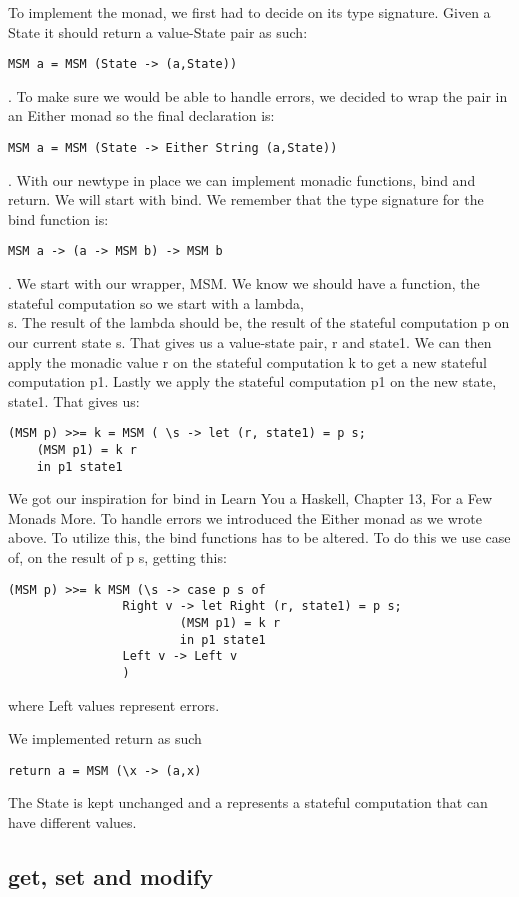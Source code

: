 \documentclass[]{article}
\begin{document}
To implement the monad, we first had to decide on its type signature. Given a State it should return a value-State pair as such: \begin{verbatim}MSM a = MSM (State -> (a,State))\end{verbatim}. To make sure we would be able to handle errors, we decided to wrap the pair in an Either monad so the final declaration is: \begin{verbatim}MSM a = MSM (State -> Either String (a,State))\end{verbatim}.
With our newtype in place we can implement monadic functions, bind and return. 
We will start with bind. We remember that the type signature for the bind function is: 
\begin{verbatim}MSM a -> (a -> MSM b) -> MSM b\end{verbatim}. We start with our wrapper, MSM. We know we should have a function, the stateful computation so we start with a lambda, \\s. The result of the lambda should be, the result of the stateful computation p on our current state s. That gives us a value-state pair, r and state1. We can then apply the monadic value r on the stateful computation k to get a new stateful computation p1. Lastly we apply the stateful computation p1 on the new state, state1. That gives us: 
\begin{verbatim}(MSM p) >>= k = MSM ( \s -> let (r, state1) = p s;
	(MSM p1) = k r
	in p1 state1
\end{verbatim}
We got our inspiration for bind in Learn You a Haskell, Chapter 13, For a Few Monads More.
To handle errors we introduced the Either monad as we wrote above. To utilize this, the bind functions has to be altered. To do this we use case of, on the result of p s,  getting this:
\begin{verbatim}
(MSM p) >>= k MSM (\s -> case p s of
				Right v -> let Right (r, state1) = p s;
						(MSM p1) = k r
						in p1 state1
				Left v -> Left v
				)
\end{verbatim}
where Left values represent errors.\par
We implemented return as such \begin{verbatim}return a = MSM (\x -> (a,x)\end{verbatim} The State is kept unchanged and a represents a stateful computation that can have different values. \par

\subsection{get, set and modify}
\end{document}
